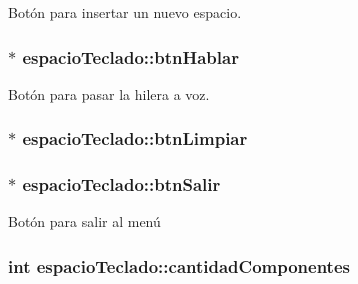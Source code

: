 Botón para insertar un nuevo espacio. 

\hypertarget{classespacio_teclado_a401d7d71c05c9f234010e33adfe51d04}{}
\subsubsection[{btn\+Hablar}]{$\ast$ espacio\+Teclado\+::btn\+Hablar\hspace{0.3cm}{\ttfamily [private]}}\label{classespacio_teclado_a401d7d71c05c9f234010e33adfe51d04}


Botón para pasar la hilera a voz. 

\hypertarget{classespacio_teclado_a8178b42312d7b9930dac260664904c4c}{}
\subsubsection[{btn\+Limpiar}]{$\ast$ espacio\+Teclado\+::btn\+Limpiar\hspace{0.3cm}{\ttfamily [private]}}\label{classespacio_teclado_a8178b42312d7b9930dac260664904c4c}
\hypertarget{classespacio_teclado_a82d9f915e17ee3491992da61a0d28a8f}{}
\subsubsection[{btn\+Salir}]{$\ast$ espacio\+Teclado\+::btn\+Salir\hspace{0.3cm}{\ttfamily [private]}}\label{classespacio_teclado_a82d9f915e17ee3491992da61a0d28a8f}


Botón para salir al menú 

\hypertarget{classespacio_teclado_ac6f638174ab5143b45b5a0658f6782e9}{}
\subsubsection[{cantidad\+Componentes}]{\setlength{\rightskip}{0pt plus 5cm}int espacio\+Teclado\+::cantidad\+Componentes\hspace{0.3cm}{\ttfamily [private]}}\label{classespacio_teclado_ac6f638174ab5143b45b5a0658f6782e9}


